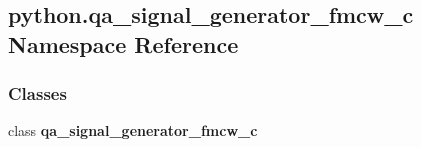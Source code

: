\subsection{python.\+qa\+\_\+signal\+\_\+generator\+\_\+fmcw\+\_\+c Namespace Reference}
\label{namespacepython_1_1qa__signal__generator__fmcw__c}
\subsubsection*{Classes}
\begin{DoxyCompactItemize}
\item 
class {\bf qa\+\_\+signal\+\_\+generator\+\_\+fmcw\+\_\+c}
\end{DoxyCompactItemize}
